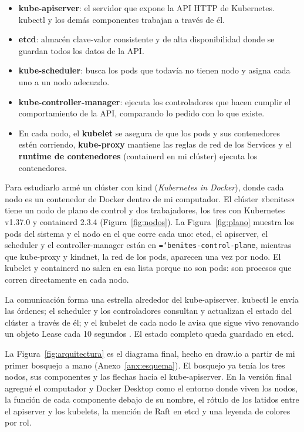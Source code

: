 \documentclass[11pt,a4paper]{article}
\newcommand{\cmd}[1]{\texttt{\hyphenchar\font=`\-\relax #1}}
\begin{document}
\begin{itemize}
  \item \textbf{kube-apiserver}: el servidor que expone la API HTTP de Kubernetes. kubectl y los demás componentes trabajan a través de él.
  \item \textbf{etcd}: almacén clave-valor consistente y de alta disponibilidad donde se guardan todos los datos de la API.
  \item \textbf{kube-scheduler}: busca los pods que todavía no tienen nodo y asigna cada uno a un nodo adecuado.
  \item \textbf{kube-controller-manager}: ejecuta los controladores que hacen cumplir el comportamiento de la API, comparando lo pedido con lo que existe.
  \item En cada nodo, el \textbf{kubelet} se asegura de que los pods y sus contenedores estén corriendo, \textbf{kube-proxy} mantiene las reglas de red de los Services y el \textbf{runtime de contenedores} (containerd en mi clúster) ejecuta los contenedores.
\end{itemize}

Para estudiarlo armé un clúster con kind (\emph{Kubernetes in Docker}), donde cada nodo es un contenedor de Docker dentro de mi computador. El clúster «benites» tiene un nodo de plano de control y dos trabajadores, los tres con Kubernetes v1.37.0 y containerd 2.3.4 (Figura~\ref{fig:nodos}). La Figura~\ref{fig:plano} muestra los pods del sistema y el nodo en el que corre cada uno: etcd, el apiserver, el scheduler y el controller-manager están en \cmd{benites-control-plane}, mientras que kube-proxy y kindnet, la red de los pods, aparecen una vez por nodo. El kubelet y containerd no salen en esa lista porque no son pods: son procesos que corren directamente en cada nodo.

La comunicación forma una estrella alrededor del kube-apiserver. kubectl le envía las órdenes; el scheduler y los controladores consultan y actualizan el estado del clúster a través de él; y el kubelet de cada nodo le avisa que sigue vivo renovando un objeto Lease cada 10 segundos \cite{k8s_kubelet,k8s_nodes}. El estado completo queda guardado en etcd.

La Figura~\ref{fig:arquitectura} es el diagrama final, hecho en draw.io a partir de mi primer bosquejo a mano (Anexo~\ref{anx:esquema}). El bosquejo ya tenía los tres nodos, sus componentes y las flechas hacia el kube-apiserver. En la versión final agregué el computador y Docker Desktop como el entorno donde viven los nodos, la función de cada componente debajo de su nombre, el rótulo de los latidos entre el apiserver y los kubelets, la mención de Raft en etcd y una leyenda de colores por rol.
\end{document}
